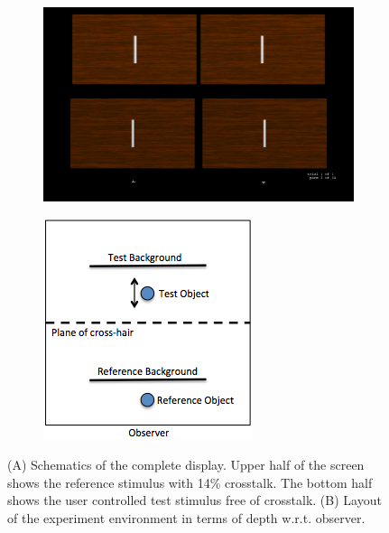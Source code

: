\begin{figure}[htbp]
    \begin{subfigure}[b]{0.65\textwidth}
        \includegraphics[width=\textwidth]{./Template_Figures/exp_env}
        \caption{}\label{fig:exp_env}
    \end{subfigure}
    \begin{subfigure}[b]{0.34\textwidth}
        \includegraphics[width=\textwidth]{./Template_Figures/exp_env_depth}
        \caption{}\label{fig:exp_env_depth}
    \end{subfigure}

    \caption{(A) Schematics of the complete display. Upper half of the screen shows the reference stimulus with 14\% crosstalk. The bottom half shows the user controlled test stimulus free of crosstalk. (B) Layout of the experiment environment in terms of depth w.r.t. observer.\label{fig:exp_env_overall}}
\end{figure}


